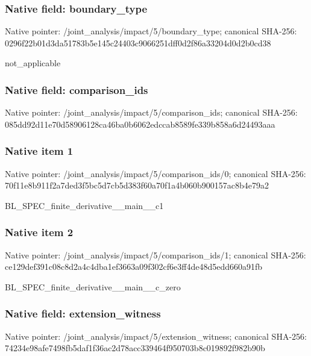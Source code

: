 \documentclass[10pt,a4paper]{article}
\begin{document}
\subsubsection{Native field: boundary\_\allowbreak{}type}
Native pointer: /joint\_\allowbreak{}analysis/impact/5/boundary\_\allowbreak{}type; canonical SHA-256: 0296f22b01d3da51783b5e145c24403c9066251dff0d2f86a33204d0d2b0cd38

\begingroup\raggedright\sloppy not\_\allowbreak{}applicable\par\endgroup

\subsubsection{Native field: comparison\_\allowbreak{}ids}
Native pointer: /joint\_\allowbreak{}analysis/impact/5/comparison\_\allowbreak{}ids; canonical SHA-256: 085dd92d11e70d58906128ca46ba0b6062edccab8589fe339b858a6d24493aaa

\subsubsection{Native item 1}
Native pointer: /joint\_\allowbreak{}analysis/impact/5/comparison\_\allowbreak{}ids/0; canonical SHA-256: 70f11e8b911f2a7ded3f5bc5d7cb5d383f60a70f1a4b060b900157ac8b4e79a2

\begingroup\raggedright\sloppy BL\_\allowbreak{}SPEC\_\allowbreak{}finite\_\allowbreak{}derivative\_\allowbreak{}\_\allowbreak{}main\_\allowbreak{}\_\allowbreak{}c1\par\endgroup

\subsubsection{Native item 2}
Native pointer: /joint\_\allowbreak{}analysis/impact/5/comparison\_\allowbreak{}ids/1; canonical SHA-256: ce129def391c08c8d2a4c4dba1ef3663a09f302cf6e3ff4de48d5edd660a91fb

\begingroup\raggedright\sloppy BL\_\allowbreak{}SPEC\_\allowbreak{}finite\_\allowbreak{}derivative\_\allowbreak{}\_\allowbreak{}main\_\allowbreak{}\_\allowbreak{}c\_\allowbreak{}zero\par\endgroup

\subsubsection{Native field: extension\_\allowbreak{}witness}
Native pointer: /joint\_\allowbreak{}analysis/impact/5/extension\_\allowbreak{}witness; canonical SHA-256: 74234e98afe7498fb5daf1f36ac2d78acc339464f950703b8c019892f982b90b
\end{document}

